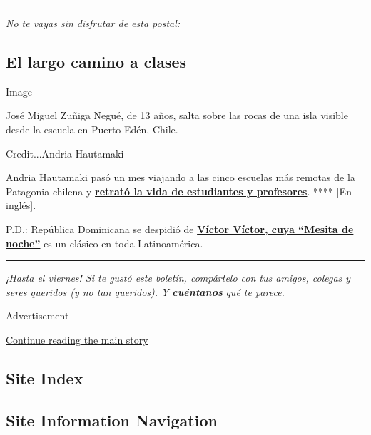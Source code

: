 \begin{center}\rule{0.5\linewidth}{\linethickness}\end{center}

\emph{No te vayas sin disfrutar de esta postal:}

\hypertarget{el-largo-camino-a-clases}{%
\subsection{El largo camino a clases}\label{el-largo-camino-a-clases}}

Image

José Miguel Zuñiga Negué, de 13 años, salta sobre las rocas de una isla
visible desde la escuela en Puerto Edén, Chile.

Credit...Andria Hautamaki

Andria Hautamaki pasó un mes viajando a las cinco escuelas más remotas
de la Patagonia chilena y
\textbf{\href{https://www.nytimes.com/2020/08/03/travel/remote-schools-patagonia.html}{retrató
la vida de estudiantes y profesores}}. **** {[}En inglés{]}.

P.D.: República Dominicana se despidió de
\textbf{\href{https://www.nytimes.com/es/2020/08/03/espanol/cultura/victor-victor-murio-coronavirus.html}{Víctor
Víctor, cuya ``Mesita de noche''}} es un clásico en toda Latinoamérica.

\begin{center}\rule{0.5\linewidth}{\linethickness}\end{center}

\emph{¡Hasta el viernes! Si te gustó este boletín, compártelo con tus
amigos, colegas y seres queridos (y no tan queridos). Y}
\textbf{\href{mailto:comentarios@nytimes.com}{\emph{cuéntanos}}}
\emph{qué te parece.}

Advertisement

\protect\hyperlink{after-bottom}{Continue reading the main story}

\hypertarget{site-index}{%
\subsection{Site Index}\label{site-index}}

\hypertarget{site-information-navigation}{%
\subsection{Site Information
Navigation}\label{site-information-navigation}}

